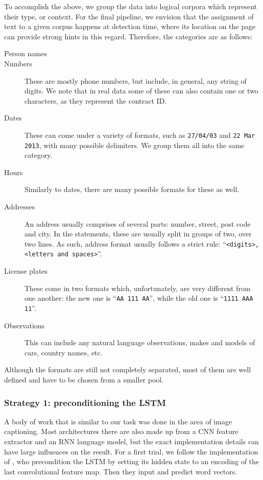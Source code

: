 			To accomplish the above, we group the data into logical corpora which represent their type, or context. For the final pipeline, we envision that the assignment of text to a given corpus happens at detection time, where its location on the page can provide strong hints in this regard. Therefore, the categories are as follows:
			\begin{description}
				\item[Person names\vspace{-1.5em}]

				\item[Numbers] These are mostly phone numbers, but include, in general, any string of digits. We note that in real data some of these can also contain one or two characters, as they represent the contract ID.

				\item[Dates] These can come under a variety of formats, such as \texttt{27/04/03} and \texttt{22 Mar 2013}, with many possible delimiters. We group them all into the same category.

				\item[Hours] Similarly to dates, there are many possible formats for these as well.

				\item[Addresses] An address usually comprises of several parts: number, street, post code and city. In the statements, these are usually split in groups of two, over two lines. As such, address format usually follows a strict rule: ``\texttt{<digits>, <letters and spaces>}''.

				\item[License plates] These come in two formats which, unfortunately, are very different from one another: the new one is ``\texttt{AA 111 AA}'', while the old one is ``\texttt{1111 AAA 11}''.

				\item[Observations] This can include any natural language observations, makes and models of cars, country names, etc.
			\end{description}
			Although the formats are still not completely separated, most of them are well defined and have to be chosen from a smaller pool.

		\subsubsection*{Strategy 1: preconditioning the LSTM}
			A body of work that is similar to our task was done in the area of image captioning. Most architectures there are also made up from a CNN feature extractor and an RNN language model, but the exact implementation details can have large influences on the result. For a first trial, we follow the implementation of \citet{lstm_precondition}, who precondition the LSTM by setting its hidden state to an encoding of the last convolutional feature map. Then they input and predict word vectors.

